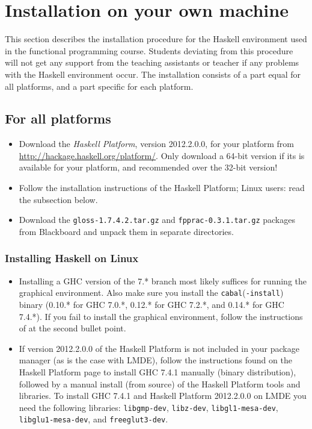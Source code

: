 \documentclass[]{article}
\begin{document}
\section{Installation on your own machine}
This section describes the installation procedure for the Haskell environment used in the functional programming course.
Students deviating from this procedure will not get any support from the teaching assistants or teacher if any problems with the Haskell environment occur.
The installation consists of a part equal for all platforms, and a part specific for each platform.

\subsection{For all platforms}
\begin{itemize}
  \item Download the \emph{Haskell Platform}, version 2012.2.0.0, for your platform from \url{http://hackage.haskell.org/platform/}. Only download a 64-bit version if its is available for your platform, and recommended over the 32-bit version!
  \item Follow the installation instructions of the Haskell Platform; Linux users: read the subsection below.
  \item Download the \texttt{gloss-1.7.4.2.tar.gz} and \texttt{fpprac-0.3.1.tar.gz} packages from Blackboard and unpack them in separate directories.
\end{itemize}

\subsubsection{Installing Haskell on Linux}
\begin{itemize}
  \item Installing a GHC version of the 7.* branch most likely suffices for running the graphical environment. Also make sure you install the \texttt{cabal}(\texttt{-install}) binary (0.10.* for GHC 7.0.*, 0.12.* for GHC 7.2.*, and 0.14.* for GHC 7.4.*). If you fail to install the graphical environment, follow the instructions of at the second bullet point.
  \item If version 2012.2.0.0 of the Haskell Platform is not included in your package manager (as is the case with LMDE), follow the instructions found on the Haskell Platform page to install GHC 7.4.1 manually (binary distribution), followed by a manual install (from source) of the Haskell Platform tools and libraries.
  To install GHC 7.4.1 and Haskell Platform 2012.2.0.0 on LMDE you need the following libraries: \texttt{libgmp-dev}, \texttt{libz-dev}, \texttt{libgl1-mesa-dev}, \texttt{libglu1-mesa-dev}, and \texttt{freeglut3-dev}.
\end{itemize}
\end{document}
